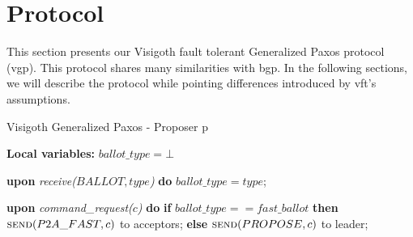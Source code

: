 \section{Protocol} 

This section presents our Visigoth fault tolerant Generalized Paxos protocol (\acrshort{vgp}). This protocol shares many similarities with \acrshort{bgp}. In the following sections, we will describe the protocol while pointing differences introduced by \acrshort{vft}'s assumptions.  


\begin{algorithm}
	\caption{Visigoth Generalized Paxos - Proposer p}
	\label{VFT-Prop}
	\textbf{Local variables:} $ballot\_type = \bot$
	\begin{algorithmic}[1]	
		
		\State \textbf{upon} \textit{receive($BALLOT, type$)} \textbf{do} 
		\State \hspace{\algorithmicindent} $ballot\_type = type$;
		\State
		
		\State \textbf{upon} \textit{command\_request($c$)} \textbf{do}   \hspace{\algorithmicindent}\hspace{\algorithmicindent}\hspace{\algorithmicindent}\hspace{\algorithmicindent}
		\State \hspace{\algorithmicindent} \textbf{if} $ballot\_type == fast\_ballot$ \textbf{then}
		\State \hspace{\algorithmicindent}\hspace{\algorithmicindent} $\Call{send}{P2A\_FAST, c}$ to acceptors;
		\State \hspace{\algorithmicindent} \textbf{else} 
		\State \hspace{\algorithmicindent}\hspace{\algorithmicindent} $\Call{send}{PROPOSE, c}$ to leader;		
	\end{algorithmic}
\end{algorithm}


